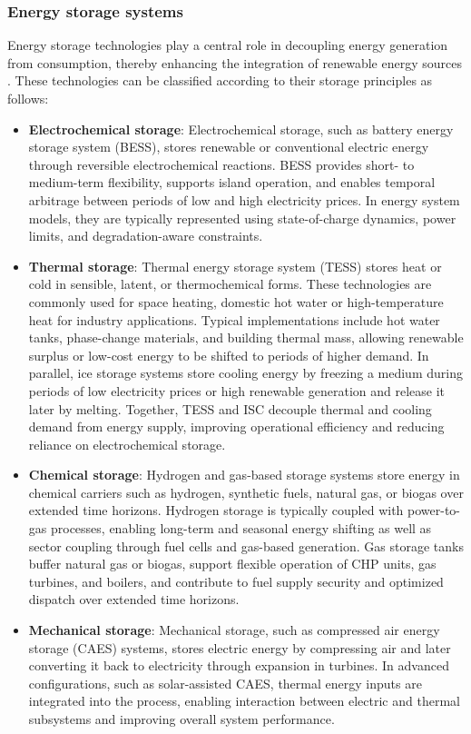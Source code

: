\documentclass[12pt,a4paper]{report}
\begin{document}
\subsubsection{Energy storage systems}  
Energy storage technologies play a central role in decoupling energy generation from consumption, thereby enhancing the integration of renewable energy sources \cite{Xu2024District, Rahman2020Assessment}. These technologies can be classified according to their storage principles as follows:

\begin{itemize}

\item \textbf{Electrochemical storage}:  
Electrochemical storage, such as battery energy storage system (BESS), stores renewable or conventional electric energy through reversible electrochemical reactions. BESS provides short- to medium-term flexibility, supports island operation, and enables temporal arbitrage between periods of low and high electricity prices.
In energy system models, they are typically represented using state-of-charge dynamics, power limits, and degradation-aware constraints.

\item \textbf{Thermal storage}:  
Thermal energy storage system (TESS) stores heat or cold in sensible, latent, or thermochemical forms. These technologies are commonly used for space heating, domestic hot water or high-temperature heat for industry applications. Typical implementations include hot water tanks, phase-change materials, and building thermal mass, allowing renewable surplus or low-cost energy to be shifted to periods of higher demand. 
In parallel, ice storage systems store cooling energy by freezing a medium during periods of low electricity prices or high renewable generation and release it later by melting. Together, TESS and ISC decouple thermal and cooling demand from energy supply, improving operational efficiency and reducing reliance on electrochemical storage.

\item \textbf{Chemical storage}:  
Hydrogen and gas-based storage systems store energy in chemical carriers such as hydrogen, synthetic fuels, natural gas, or biogas over extended time horizons. Hydrogen storage is typically coupled with power-to-gas processes, enabling long-term and seasonal energy shifting as well as sector coupling through fuel cells and gas-based generation. 
Gas storage tanks buffer natural gas or biogas, support flexible operation of CHP units, gas turbines, and boilers, and contribute to fuel supply security and optimized dispatch over extended time horizons.

\item \textbf{Mechanical storage}:  
Mechanical storage, such as compressed air energy storage (CAES) systems, stores electric energy by compressing air and later converting it back to electricity through expansion in turbines. In advanced configurations, such as solar-assisted CAES, thermal energy inputs are integrated into the process, enabling interaction between electric and thermal subsystems and improving overall system performance.

\end{itemize}
\end{document}
